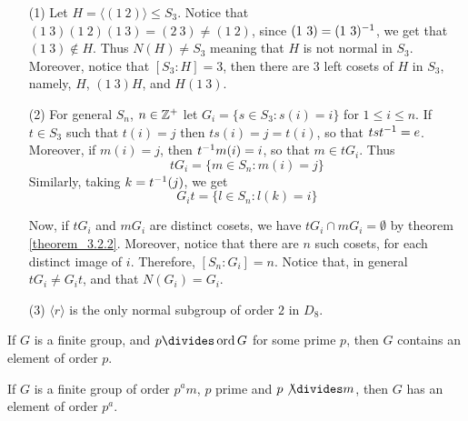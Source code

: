\begin{example}\label{example_3.6}
  \begin{enumerate}
    \item[(1)] Let $H=\langle (1 \ 2) \rangle \leq S_3$. Notice that $(1 \ 3)(1 \
      2)(1 \ 3)=(2 \ 3) \neq (1 \ 2)$, since $(1 \ 3)=(1 \ 3)^{-1}$, we
      get that $(1 \ 3) \notin H$. Thus $N(H) \neq S_3$ meaning that $H$
      is not normal in $S_3$. Moreover, notice that $[S_3:H]=3$, then
      there are $3$ left cosets of $H$ in $S_3$, namely, $H$,  $(1 \ 3)H$,
      and $H(1 \ 3)$.

    \item[(2)] For general $S_n$,  $n \in \mathbb{Z}^+$ let  $G_i=\{s \in S_3:
      s(i)=i\}$ for $1 \leq i \leq n$. If $t \in S_3$ such that $t(i)=j$
      then $ts(i)=j=t(i)$, so that $tst^{-1}=e$. Moreover, if $m(i)=j$,
      then $t^{-1}m(i)=i$, so that $m \in tG_i$. Thus
      \begin{equation*}
        tG_i=\{m \in S_n : m(i)=j\}
      \end{equation*}
      Similarly, taking $k=t^{-1}(j)$, we get
      \begin{equation*}
        G_it=\{l \in S_n : l(k)=i\}
      \end{equation*}

      Now, if $tG_i$ and  $mG_i$ are distinct cosets, we have  $tG_i \cap
      mG_i = \emptyset$ by theorem \ref{theorem_3.2.2}. Moreover, notice that
      there are $n$ such cosets, for each distinct image of $i$.
      Therefore, $[S_n:G_i]=n$. Notice that, in general $tG_i \neq G_it$,
      and that  $N(G_i)=G_i$.

    \item[(3)] $\langle r \rangle$ is the only normal subgroup of order $2$ in
      $D_8$.
  \end{enumerate}
\end{example}

\begin{theorem}[Cauchy]\label{theorem_3.3.4}
  If $G$ is a finite group, and  $p \divides \ord{G}$ for some prime $p$, then $G$
  contains an element of order  $p$.
\end{theorem}

\begin{theorem}[Sylow]\label{theorem_3.3.5}
  If $G$ is a finite group of order  $p^am$,  $p$ prime and  $p \not{\divides} m$,
  then $G$ has an element of order  $p^a$.
\end{theorem}

